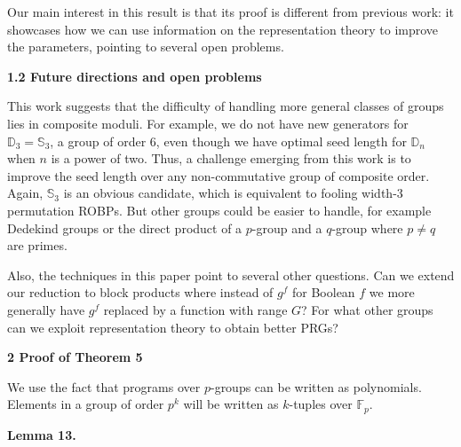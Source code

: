 Our main interest in this result is that its proof is different from
previous work: it showcases how we can use information on the representation
theory to improve the parameters, pointing to several open problems.\par






\par\medskip\noindent\textbf{
1.2 Future directions and open problems}\par




This work suggests that the difficulty of handling more general classes
of groups lies in composite moduli. For example, we do not have new
generators for $\mathbb{D}_{3}=\mathbb{S}_{3}$, a group of order $6$, even though
we have optimal seed length for $\mathbb{D}_{n}$ when $n$ is a power of two. Thus, a challenge emerging from this work is to improve the seed length over any non-commutative group of composite order. Again, $\mathbb{S}_{3}$ is an obvious candidate, which is equivalent to fooling
width-3 permutation ROBPs. But other groups could be easier to handle,
for example Dedekind groups or the direct product
of a $p$-group and a $q$-group where $p\neq q$ are primes.\par




Also, the techniques in this paper point to several other questions.
Can we extend our reduction to block products where instead of $g^{f}$ for Boolean $f$ we more generally have $g^{f}$ replaced by a function with range $G$? For what other groups can we exploit representation theory to obtain better PRGs?\par






\par\medskip\noindent\textbf{
2 Proof of Theorem 5
}\par




We use the fact that programs over $p$-groups can be written as polynomials.
Elements in a group of order $p^{k}$ will be written as $k$-tuples
over $\mathbb{F}_{p}$.\par





\par\medskip\noindent\textbf{
\textbf{Lemma 13}\textbf{.}
}\par



